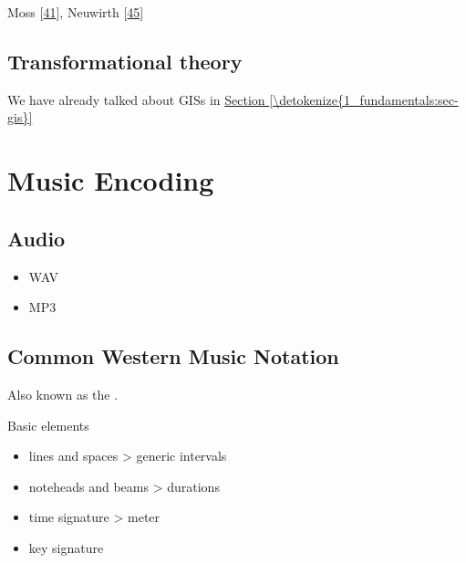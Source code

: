 \documentclass[letterpaper,10pt,english]{sphinxmanual}
\begin{document}
\sphinxAtStartPar
Moss  {[}\hyperlink{cite.8_bibliography:id56}{41}{]}, Neuwirth  {[}\hyperlink{cite.8_bibliography:id78}{45}{]}


\section{Transformational theory}
\label{\detokenize{4_harmony:transformational-theory}}
\sphinxAtStartPar
We have already talked about GISs in \hyperref[\detokenize{1_fundamentals:sec-gis}]{Section \ref{\detokenize{1_fundamentals:sec-gis}}}


\chapter{Music Encoding}
\label{\detokenize{encodings:music-encoding}}\label{\detokenize{encodings::doc}}

\section{Audio}
\label{\detokenize{encodings:audio}}\begin{itemize}
\item {} 
\sphinxAtStartPar
WAV

\item {} 
\sphinxAtStartPar
MP3

\end{itemize}


\section{Common Western Music Notation}
\label{\detokenize{encodings:common-western-music-notation}}
\sphinxAtStartPar
Also known as the .

\sphinxAtStartPar
Basic elements
\begin{itemize}
\item {} 
\sphinxAtStartPar
lines and spaces \sphinxhyphen{}\textgreater{} generic intervals

\item {} 
\sphinxAtStartPar
noteheads and beams \sphinxhyphen{}\textgreater{} durations

\item {} 
\sphinxAtStartPar
time signature \textendash{}\textgreater{} meter

\item {} 
\sphinxAtStartPar
key signature

\end{itemize}
\end{document}
